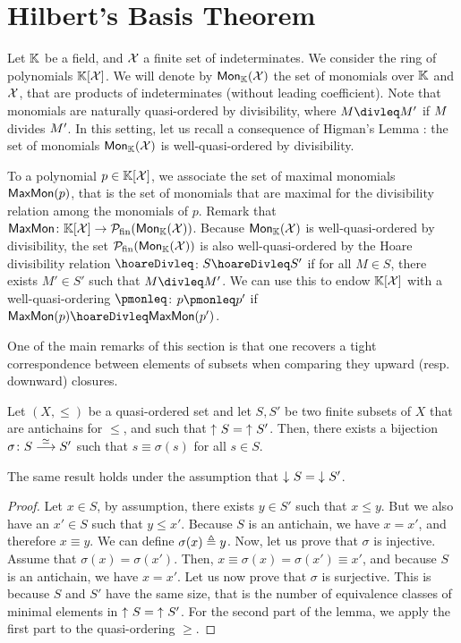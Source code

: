\section{Hilbert's Basis Theorem}
\label{sec:hilbert}

Let $\mathbb{K}$ be a field, and $\mathcal{X}$ a finite set of indeterminates. We
consider the ring of polynomials $\Poly{\Indets}$. We will denote by
$\Mon{\Indets}$ the set of monomials over $\mathbb{K}$ and $\mathcal{X}$, that are
products of indeterminates (without leading coefficient). Note that monomials
are naturally quasi-ordered by divisibility, where $\mon \divleq \mon'$ if
$\mon$ divides $\mon'$. In this setting, let us recall a consequence of
Higman's Lemma \cite{HIG52}: the set of monomials $\Mon{\Indets}$ is
well-quasi-ordered by divisibility.

To a polynomial $p \in \Poly{\Indets}$, we associate the set of maximal
monomials $\mathsf{MaxMon}(p)$, that is the set of monomials that are maximal for the
divisibility relation among the monomials of $p$. Remark that $\MaxMon \colon
\Poly{\Indets} \to \Pfin(\Mon{\Indets})$. Because $\Mon{\Indets}$ is
well-quasi-ordered by divisibility, the set $\Pfin(\Mon{\Indets})$ is also
well-quasi-ordered by the Hoare divisibility relation $\hoareDivleq$: $S \hoareDivleq
S'$ if for all $M \in S$, there exists $M' \in S'$ such that $M \divleq M'$.
We can use this to endow $\Poly{\Indets}$ with a well-quasi-ordering $\pmonleq$:
$p \pmonleq p'$ if $\MaxMon(p) \hoareDivleq \MaxMon(p')$.

One of the main remarks of this section is that one recovers a tight
correspondence between elements of subsets when comparing they upward (resp.
downward) closures.

\begin{lemma}
    \label{lem:antichain-bijection}
    Let $(X,\leq)$ be a quasi-ordered set
    and let $S, S'$ be two finite subsets of $X$
    that are antichains for $\leq$,
    and such that $\upset{S} = \upset{S'}$.
    Then, there exists a bijection $\sigma \colon S \stackrel{\simeq}{\longrightarrow} S'$
    such that $s \equiv \sigma(s)$ for all $s \in S$.

    The same result holds under the assumption that
    $\dwset{S} = \dwset{S'}$.
\end{lemma}
\begin{proof}
    Let $x \in S$, by assumption,
    there exists $y \in S'$
    such that $x \leq y$. But we also have
    an $x' \in S$ such that $y \leq x'$.
    Because $S$ is an antichain, we have $x = x'$,
    and therefore $x \equiv y$.
    We can define $\sigma(x) \triangleq y$.
    Now, let us prove that $\sigma$ is injective.
    Assume that $\sigma(x) = \sigma(x')$.
    Then, $x \equiv \sigma(x) = \sigma(x') \equiv x'$,
    and because $S$ is an antichain, we have $x = x'$.
    Let us now prove that $\sigma$ is surjective.
    This is because $S$ and $S'$ have the same size, that is
    the number of equivalence classes of minimal elements
    in $\upset{S} = \upset{S'}$.
    For the second part of the lemma, we apply
    the first part to the quasi-ordering $\geq$.
\end{proof}



